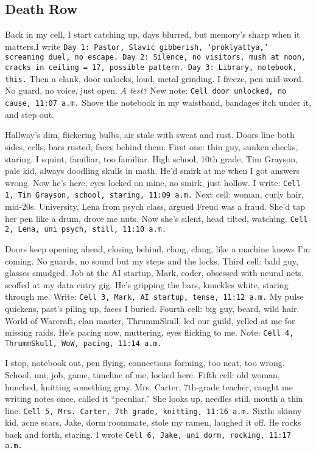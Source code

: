 \documentclass[12pt,oneside]{book} %
\newcommand{\note}[1]{\texttt{#1}}
\begin{document}
\subsection*{Death Row}
Back in my cell, I start catching up, days blurred, but memory’s sharp when it matters.I write \note{Day 1: Pastor, Slavic gibberish, ‘proklyattya,’ screaming duel, no escape. Day 2: Silence, no visitors, mush at noon, cracks in ceiling = 17, possible pattern. Day 3: Library, notebook, this.} Then a clank, door unlocks, loud, metal grinding. I freeze, pen mid-word. No guard, no voice, just open. \textit{A test?} New note: \note{Cell door unlocked, no cause, 11:07 a.m.} Shove the notebook in my waistband, bandages itch under it, and step out.

Hallway’s dim, flickering bulbs, air stale with sweat and rust. Doors line both sides, cells, bars rusted, faces behind them. First one: thin guy, sunken cheeks, staring. I squint, familiar, too familiar. High school, 10th grade, Tim Grayson, pale kid, always doodling skulls in math. He’d smirk at me when I got answers wrong. Now he’s here, eyes locked on mine, no smirk, just hollow. I write: \note{Cell 1, Tim Grayson, school, staring, 11:09 a.m.} Next cell: woman, curly hair, mid-20s. University, Lena from psych class, argued Freud was a fraud. She’d tap her pen like a drum, drove me nuts. Now she’s silent, head tilted, watching. \note{Cell 2, Lena, uni psych, still, 11:10 a.m.}

Doors keep opening ahead, closing behind, clang, clang, like a machine knows I’m coming. No guards, no sound but my steps and the locks. Third cell: bald guy, glasses smudged. Job at the AI startup, Mark, coder, obsessed with neural nets, scoffed at my data entry gig. He’s gripping the bars, knuckles white, staring through me. Write: \note{Cell 3, Mark, AI startup, tense, 11:12 a.m.} My pulse quickens, past’s piling up, faces I buried. Fourth cell: big guy, beard, wild hair. World of Warcraft, clan master, ThrummSkull, led our guild, yelled at me for missing raids. He’s pacing now, muttering, eyes flicking to me. Note: \note{Cell 4, ThrummSkull, WoW, pacing, 11:14 a.m.}

I stop, notebook out, pen flying, connections forming, too neat, too wrong. School, uni, job, game, timeline of me, locked here. Fifth cell: old woman, hunched, knitting something gray. Mrs. Carter, 7th-grade teacher, caught me writing notes once, called it “peculiar.” She looks up, needles still, mouth a thin line. \note{Cell 5, Mrs. Carter, 7th grade, knitting, 11:16 a.m.} Sixth: skinny kid, acne scars, Jake, dorm roommate, stole my ramen, laughed it off. He rocks back and forth, staring. I wrote \note{Cell 6, Jake, uni dorm, rocking, 11:17 a.m.}
\end{document}

